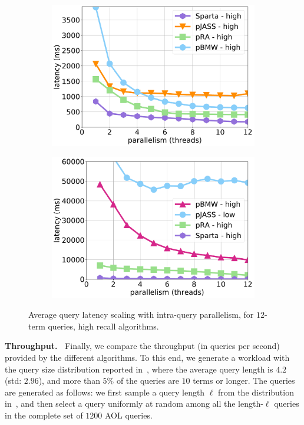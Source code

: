 {{\begin{figure}[tbh]
\centering
      \begin{subfigure}[t]{0.35\textwidth}
         \includegraphics[width=\textwidth]{figures/latency_12terms_clueweb.pdf}
        \caption{\cw}
      \end{subfigure} %
\hfill %
      \begin{subfigure}[t]{0.35\textwidth}
      \includegraphics[width=\textwidth]{figures/latency_12terms_cluewebX10.pdf}
	  \caption{\cwten}
      \end{subfigure}
\caption{Average query latency scaling with intra-query parallelism, for $12$-term queries, high recall algorithms.}
\label{fig:threads-scaling}
\end{figure}

{\bf Throughput.\ } Finally, we compare the throughput (in queries per second) provided by the different
algorithms. To this end, we generate a workload with the query size distribution reported in~\cite{sigir/Guy16},
where the average query length is $4.2$ (std: $2.96$), and more than $5\%$ of the queries are $10$ terms or longer.
The queries are generated as follows: we first sample a query length $\ell$ from the distribution in~\cite{sigir/Guy16}, and then 
select a query uniformly at random among all the length-$\ell$ queries in the complete set of  $1200$ AOL queries. 

}}
